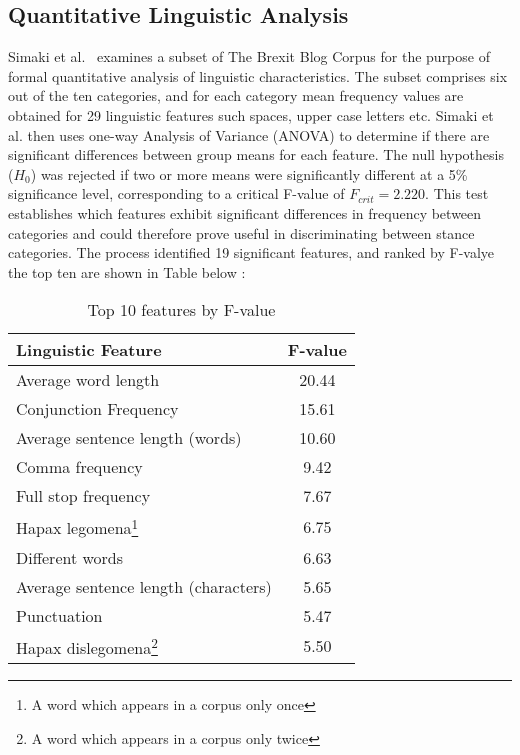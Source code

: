 \documentclass[Dissertation.tex]{subfiles}
\begin{document}
\subsection{Quantitative Linguistic Analysis}
Simaki et al.\ \cite{simakiEvaluatingStanceannotatedSentences2018} examines a subset of The Brexit Blog Corpus for the purpose of formal quantitative analysis of linguistic characteristics. The subset comprises six out of the ten categories, and for each category mean frequency values are obtained for 29 linguistic features such spaces, upper case letters etc. Simaki et al.\cite{simakiEvaluatingStanceannotatedSentences2018} then uses one-way Analysis of Variance (ANOVA) to determine if there are significant differences between group means for each feature. The null hypothesis ($ H_0 $) was rejected if two or more means were significantly different at a 5\% significance level, corresponding to a critical F-value of $ F_{crit} =2.220 $. This test establishes which features exhibit significant differences in frequency between categories and could therefore prove useful in discriminating between stance categories. The process identified 19 significant features, and ranked by F-valye the top ten are shown in Table below \cite{simakiDetectionStanceRelatedCharacteristics2018}:

\begin{table}[h]
	\centering
	\begin{minipage}{0.6\textwidth}
		\renewcommand*\footnoterule{}
		
		
	\caption{Top 10 features by F-value}
	\begin{tabularx}{\linewidth}{X c}
		\toprule
		Linguistic Feature 			&	F-value\\ \midrule
		Average word length			&	20.44\\
		Conjunction Frequency		& 	15.61\\
		Average sentence length (words)	& 10.60\\
		Comma frequency				&	9.42\\
		Full stop frequency			&	7.67\\
		Hapax legomena\footnote{A word which appears in a corpus only once} & 6.75\\
		Different words				&	6.63\\
		Average sentence length (characters) & 5.65\\
		Punctuation 				&	5.47\\
		Hapax dislegomena\footnote{A word which appears in a corpus only twice} & 5.50\\
		\bottomrule
	\end{tabularx}
	\end{minipage}
\end{table}
\end{document}
